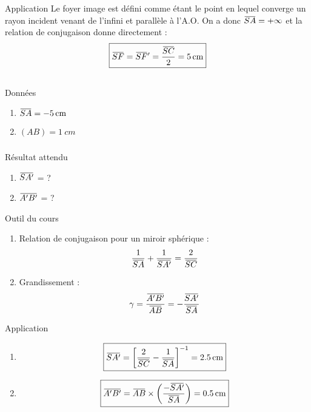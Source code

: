 \documentclass[10pt,a5paper,notitlepage]{book}
\begin{document}
\begin{NCexem}{Application}
    Le foyer image est défini comme étant le point en lequel converge un rayon
    incident venant de l'infini et parallèle à l'A.O. On a donc $\SA = +\infty$
    et la relation de conjugaison donne directement :
    \[ \boxed{\SF = \SF' = \frac{\SC}{2} = \SI{5}{cm}} \]
\end{NCexem}

\subsection{}
\begin{NCdefi}{Données}
    \begin{enumerate}
        \item $\SA = \SI{-5}{cm}$
        \item $(AB) = \SI{1}{cm}$
    \end{enumerate}
\end{NCdefi}

\subsubsection{}
\begin{NCprop}{Résultat attendu}
    \begin{enumerate}
        \item $\SAp$ = ?
        \item $\ABp$ = ?
    \end{enumerate}
\end{NCprop}

\begin{NCdemo}{Outil du cours}
    \begin{enumerate}
        \item Relation de conjugaison pour un miroir sphérique :
            \[ \frac{1}{\SA} + \frac{1}{\SAp} = \frac{2}{\SC} \]
        \item Grandissement :
            \[ \g = \frac{\ABp}{\ABb} = - \frac{\SAp}{\SA} \]
    \end{enumerate}
    
\end{NCdemo}

\begin{NCexem}{Application}
    \begin{enumerate}
        \item \[ \boxed{\SAp = \left[ \frac{2}{\SC}- \frac{1}{\SA}\right]^{-1} =
            \SI{+2.5}{cm}}\]
        \item \[ \boxed{\ABp = \ABb\times \LR{-\SAp}{\SA} = \SI{0.5}{cm}} \]
    \end{enumerate}
\end{NCexem}
\end{document}
